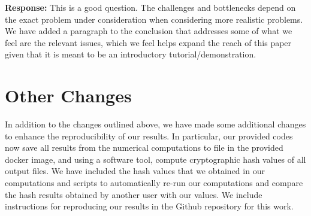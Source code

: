 \documentclass{article}
\begin{document}
\begin{enumerate}
  \textbf{Response:} This is a good question. The challenges and
  bottlenecks depend on the exact problem under consideration when considering
  more realistic problems. We have added a paragraph to the conclusion
  that addresses some of what we feel are the relevant issues, which
  we feel helps expand the reach of this paper given that it is meant
  to be an introductory tutorial/demonstration.
  
\end{enumerate}

\section{Other Changes}

In addition to the changes outlined above, we have made some additional
changes to enhance the reproducibility of our results. In particular,
our provided codes now save all results from the numerical computations
to file in the provided docker image, and using a software tool,
compute cryptographic hash values of all output files. We have included
the hash values that we obtained in our computations and scripts to
automatically re-run our computations and compare the hash results
obtained by another user with our values. We include instructions
for reproducing our results in the Github repository for this work.
\end{document}
